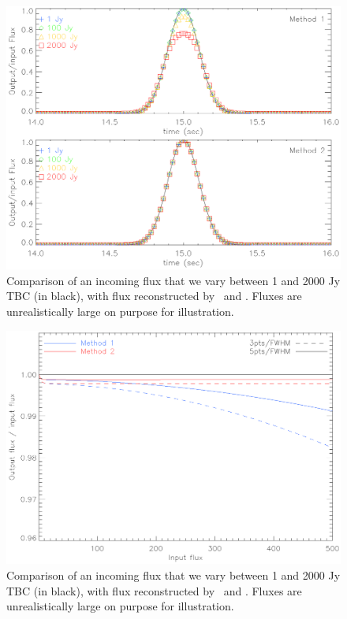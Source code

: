 \begin{figure}
  \includegraphics[clip, angle=0, width=\columnwidth]{Figures/planet_profiles_2.eps}
  \caption{Comparison of an incoming flux that we vary between 1 and 2000 Jy TBC (in black), with flux reconstructed by \methodu\ and \methodd. Fluxes are unrealistically large on purpose for illustration. }
  \label{fig:planet_profiles}
\end{figure}


\begin{figure}
  \includegraphics[clip, angle=0, width=\columnwidth]{Figures/flux_out_vs_in.eps}
  \caption{Comparison of an incoming flux that we vary between 1 and 2000 Jy TBC (in black), with flux reconstructed by \methodu\ and \methodd. Fluxes are unrealistically large on purpose for illustration. }
  \label{fig:flux_out_vs_in}
\end{figure}


